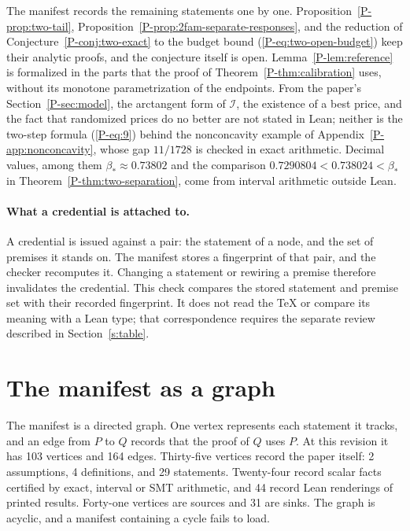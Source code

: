 \documentclass[11pt]{article}
\newcommand{\pref}[1]{\ref*{P-#1}}
\newcommand{\peqref}[1]{(\ref*{P-#1})}
\begin{document}
The manifest records the remaining statements one by one.
Proposition~\pref{prop:two-tail}, Proposition~\pref{prop:2fam-separate-responses},
and the reduction of Conjecture~\pref{conj:two-exact} to the budget bound
\peqref{eq:two-open-budget} keep their analytic proofs, and the conjecture
itself is open. Lemma~\pref{lem:reference} is formalized in the parts that
the proof of Theorem~\pref{thm:calibration} uses, without its monotone
parametrization of the endpoints. From the paper's
Section~\pref{sec:model}, the arctangent form of $\mathcal I$, the existence of a best price, and the
fact that randomized prices do no better are not stated in Lean; neither is
the two-step formula \peqref{eq:9} behind the nonconcavity example of
Appendix~\pref{app:nonconcavity}, whose gap $11/1728$ is checked in exact
arithmetic. Decimal values, among them $\beta_*\approx0.73802$ and the
comparison $0.7290804<0.738024<\beta_*$ in
Theorem~\pref{thm:two-separation}, come from interval arithmetic outside
Lean.

\paragraph{What a credential is attached to.}
A credential is issued against a pair: the statement of a node, and the set
of premises it stands on. The manifest stores a fingerprint of that pair,
and the checker recomputes it. Changing a statement or rewiring a premise
therefore invalidates the credential. This check compares the stored statement and premise set with their
recorded fingerprint. It does not read the TeX or compare its meaning with
a Lean type; that correspondence requires the separate review described
in Section~\ref{s:table}.

\section{The manifest as a graph}
\label{s:graph}

The manifest is a directed graph. One vertex represents each statement it
tracks, and an edge from $P$ to $Q$ records that the proof of $Q$ uses $P$.
At this revision it has 103 vertices and 164 edges. Thirty-five vertices
record the paper itself: 2 assumptions, 4 definitions, and 29 statements.
Twenty-four record scalar facts certified by exact, interval or SMT
arithmetic, and 44 record Lean renderings of printed results. Forty-one
vertices are sources and 31 are sinks. The graph is acyclic, and a manifest
containing a cycle fails to load.
\end{document}
